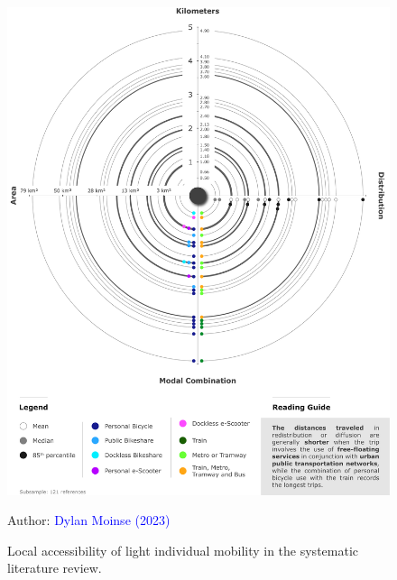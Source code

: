 \begin{refsegment}
\begin{figure}[h!]\vspace*{4pt}
    \caption{Local accessibility of light individual mobility in the systematic literature review.}
    \label{fig-chap2:distances-estimees-rsl}
    \centerline{\includegraphics[width=1\columnwidth]{src/Figures/Chap-2/EN_RSL_Aires_influence.pdf}}
    \vspace{5pt}
    \begin{flushright}\scriptsize{
    Author: \textcolor{blue}{Dylan Moinse (2023)}
    }\end{flushright}
\end{figure}


\end{refsegment}
